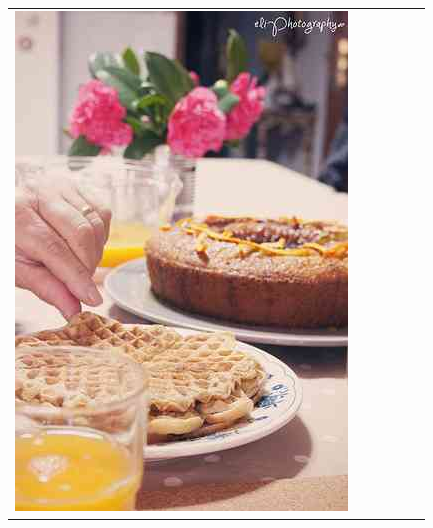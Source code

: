 \begin{figure}
\begin{tabular}{m{.01\linewidth} m{.16\linewidth} m{.16\linewidth} m{.16\linewidth} m{.16\linewidth} m{.16\linewidth}}
    \includegraphics[width=\linewidth]{../style/figures/flickr_on_flickr/pred_style_Romantic/0.jpg} &

\end{tabular}
\end{figure}
